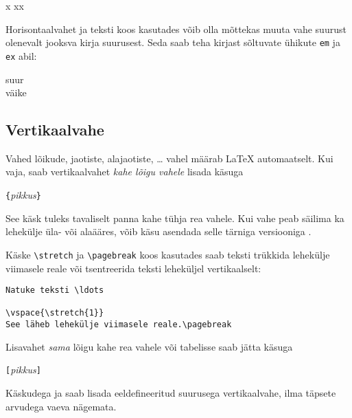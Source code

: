 \begin{example}
x
xx
\end{example}

Horisontaalvahet ja teksti koos kasutades võib olla mõttekas muuta vahe
suurust olenevalt jooksva kirja suurusest. Seda saab teha kirjast
sõltuvate ühikute \texttt{em} ja \texttt{ex} abil:

\begin{example}
{\Large{}suu\hspace{1em}r}\\
{\tiny{}väik\hspace{1em}e}
\end{example}

\subsection{Vertikaalvahe}

Vahed lõikude, jaotiste, alajaotiste, \ldots{} vahel määrab \LaTeX{}
automaatselt. Kui vaja, saab vertikaalvahet \emph{kahe lõigu vahele}
lisada käsuga
\begin{lscommand}
\verb|{|\emph{pikkus}\verb|}|
\end{lscommand}

See käsk tuleks tavaliselt panna kahe tühja rea vahele. Kui vahe peab
säilima ka lehekülje üla- või alaääres, võib käsu  asendada
selle tärniga versiooniga .

Käske \verb|\stretch| ja \verb|\pagebreak| koos kasutades saab teksti
trükkida lehekülje viimasele reale või tsentreerida teksti leheküljel
vertikaalselt:
\begin{code}
\begin{verbatim}
Natuke teksti \ldots

\vspace{\stretch{1}}
See läheb lehekülje viimasele reale.\pagebreak
\end{verbatim}
\end{code}

Lisavahet \emph{sama} lõigu kahe rea vahele või tabelisse saab jätta
käsuga
\begin{lscommand}
\ci{\bs}\verb|[|\emph{pikkus}\verb|]|
\end{lscommand}

Käskudega  ja  saab lisada eeldefineeritud
suurusega vertikaalvahe, ilma täpsete arvudega vaeva nägemata.

